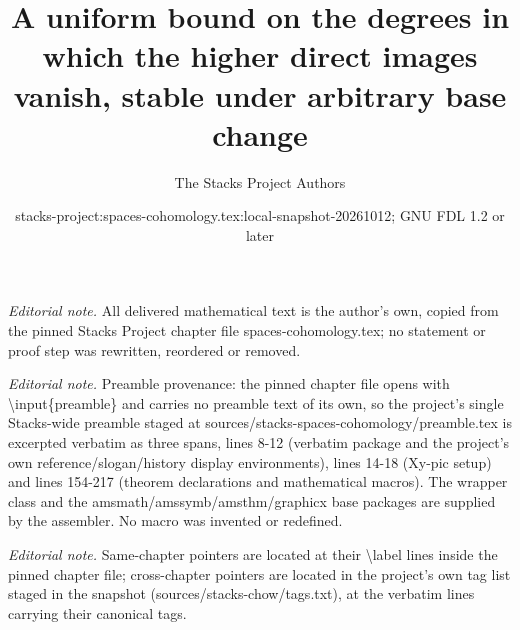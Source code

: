 \documentclass[10pt,a4paper]{amsart}
\title{A uniform bound on the degrees in which the higher direct images vanish, stable under arbitrary base change}
\author{The Stacks Project Authors}
\date{stacks-project:spaces-cohomology.tex:local-snapshot-20261012; GNU FDL 1.2 or later}
\theoremstyle{plain}
\theoremstyle{definition}
\theoremstyle{remark}
\numberwithin{equation}{subsection}
\begin{document}
\maketitle
\noindent\textit{Editorial note.} All delivered mathematical text is the author's own, copied from the pinned Stacks Project chapter file spaces-cohomology.tex; no statement or proof step was rewritten, reordered or removed.\par\medskip
\noindent\textit{Editorial note.} Preamble provenance: the pinned chapter file opens with \textbackslash{}input\{preamble\} and carries no preamble text of its own, so the project's single Stacks-wide preamble staged at sources/stacks-spaces-cohomology/preamble.tex is excerpted verbatim as three spans, lines 8-12 (verbatim package and the project's own reference/slogan/history display environments), lines 14-18 (Xy-pic setup) and lines 154-217 (theorem declarations and mathematical macros). The wrapper class and the amsmath/amssymb/amsthm/graphicx base packages are supplied by the assembler. No macro was invented or redefined.\par\medskip
\noindent\textit{Editorial note.} Same-chapter pointers are located at their \textbackslash{}label lines inside the pinned chapter file; cross-chapter pointers are located in the project's own tag list staged in the snapshot (sources/stacks-chow/tags.txt), at the verbatim lines carrying their canonical tags.\par\medskip
\end{document}
